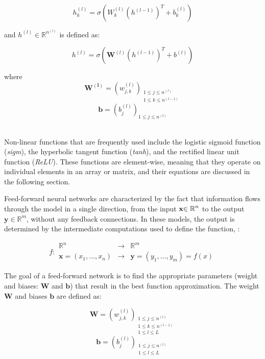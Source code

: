 \begin{equation}
h_{k}^{(l)}=\sigma{(W_{k}^{(l)}\left(h^{(l-1)}\right)^{T}+b_{k}^{(l)})}\label{eq:wb3}
\end{equation}

and $h^{(l)}\in\mathbb{R}^{n^{(l)}}$ is defined as: 

\[
h^{(l)}=\sigma{(\boldsymbol{W}^{(l)}\left(h^{(l-1)}\right)^{T}+b^{(l)})}
\]

where 
\[
\boldsymbol{W^{(l)}}=(w_{j,k}^{(l)})_{\begin{array}{c}
1\leq j\leq n^{(l)}\\
1\leq k\leq n^{(l-1)}
\end{array}}
\]
\[
\boldsymbol{b}=(b_{j}^{(l)})_{1\leq j\leq n^{(l)}}
\]
\

Non-linear functions that are frequently used include the logistic sigmoid function (\textit{sigm}), the hyperbolic tangent function (\textit{tanh}), and the rectified linear unit function (\textit{ReLU}). These functions are element-wise, meaning that they operate on individual elements in an array or matrix, and their equations are discussed in the following section. 

Feed-forward neural networks are characterized by the fact that information flows through the model in a single direction, from the input $\textbf{x\ensuremath{\mathbb{\in R}^{n}}}$ to the output $\mathbf{y}\in\mathbb{R}^{m}$, without any feedback connections. In these models, the output is determined by the intermediate computations used to define the function, \cite{Goodfellow-et-al-2016}:

\[
f:\begin{array}{ccc}
\mathbb{R^{\mathit{n}}} & \rightarrow & \mathbb{R^{\mathit{m}}}\\
\boldsymbol{x}=(x_{1},...,x_{n}) & \rightarrow & \boldsymbol{y}=(y_{1},...,y_{m})=f(x)
\end{array}
\]

The goal of a feed-forward network is  to find the appropriate parameters (weight and biases: $\boldsymbol{W}$ and \textbf{$\boldsymbol{b}$}) that result in the best function approximation. The weight $\boldsymbol{W}$ and biases \textbf{$\boldsymbol{b}$} are defined as:

\[
\boldsymbol{W}=(w_{j,k}^{(l)})_{\begin{array}{c}
1\leq j\leq n^{(l)}\\
1\leq k\leq n^{(l-1)}\\
1\leq l\leq L
\end{array}}
\]
\[
\boldsymbol{b}=(b_{j}^{(l)})_{\begin{array}{c}
1\leq j\leq n^{(l)}\\
1\leq l\leq L\\
\\
\end{array}}
\]
 

